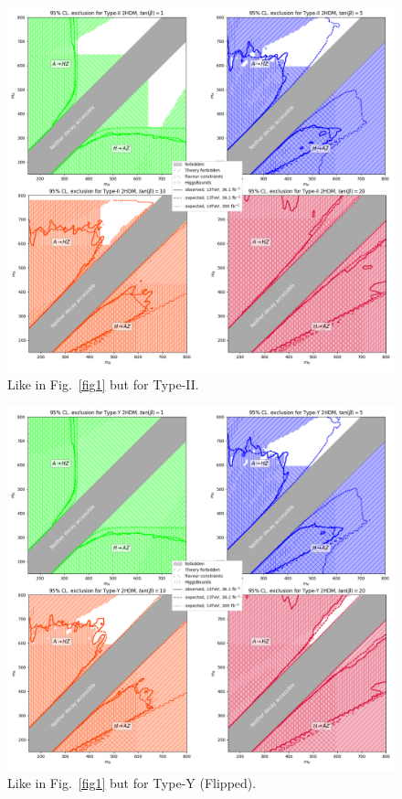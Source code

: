 \begin{figure}[t!]		
    \includegraphics[width=\textwidth]{single_tbs/type2.png}
    \caption{Like in Fig.~\ref{fig1} but for Type-II.}\label{fig2}
\end{figure}


\begin{figure}[t!]	     
    \includegraphics[width=\textwidth]{single_tbs/type3.png}
    \caption{Like in Fig.~\ref{fig1} but for Type-Y (Flipped).}\label{fig3}
\end{figure}

